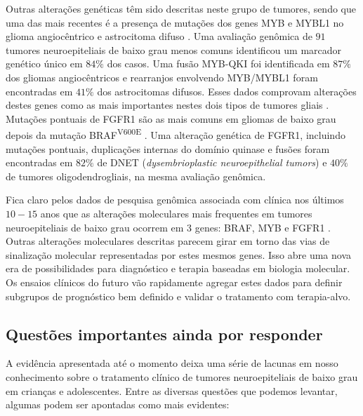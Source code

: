 \documentclass[11pt,a4paper,oldfontcommands]{memoir}
\begin{document}
Outras alterações genéticas têm sido descritas neste grupo de tumores, sendo que uma das mais recentes é a presença de mutações dos genes MYB e MYBL1 no glioma angiocêntrico e astrocitoma difuso \cite{Tatevossian2010}. Uma avaliação genômica de \(91\) tumores neuroepiteliais de baixo grau menos comuns identificou um marcador genético único em \(84\%\) dos casos. Uma fusão MYB-QKI foi identificada em \(87\%\) dos gliomas angiocêntricos e rearranjos envolvendo MYB/MYBL1 foram encontradas em \(41\%\) dos astrocitomas difusos. Esses dados comprovam alterações destes genes como as mais importantes nestes dois tipos de tumores gliais \cite{Qaddoumi2016}. Mutações pontuais de FGFR1 são as mais comuns em gliomas de baixo grau depois da mutação BRAF\textsuperscript{V600E} \cite{now209}. Uma alteração genética de FGFR1, incluindo mutações pontuais, duplicações internas do domínio quinase e fusões foram encontradas em \(82\%\) de DNET (\textit{dysembrioplastic neuroepithelial tumors}) e \(40\%\) de tumores oligodendrogliais, na mesma avaliação genômica.

Fica claro pelos dados de pesquisa genômica associada com clínica nos últimos \(10-15\) anos que as alterações moleculares mais frequentes em tumores neuroepiteliais de baixo grau ocorrem em 3 genes: BRAF, MYB e FGFR1 \cite{now209,Qaddoumi2016}. Outras alterações moleculares descritas parecem girar em torno das vias de sinalização molecular representadas por estes mesmos genes. Isso abre uma nova era de possibilidades para diagnóstico e terapia baseadas em biologia molecular. Os ensaios clínicos do futuro vão rapidamente agregar estes dados para definir subgrupos de prognóstico bem definido e validar o tratamento com terapia-alvo.

\subsection{Questões importantes ainda por responder}

A evidência apresentada até o momento deixa uma série de lacunas em nosso conhecimento sobre o tratamento clínico de tumores neuroepiteliais de baixo grau em crianças e adolescentes. Entre as diversas questões que podemos levantar, algumas podem ser apontadas como mais evidentes:
\end{document}
